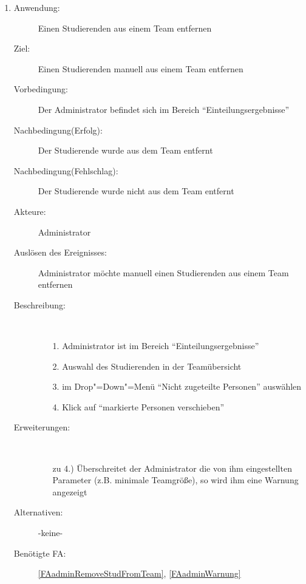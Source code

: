 \documentclass[parskip=full]{scrartcl}
\newcommand{\swtLabel}[1]{\textbf{/#1\arabic*0/}}
\begin{document}
\begin{enumerate} [label=\swtLabel{A}]
  \item \label{UCadminRemoveStudFromTeam}
    \begin{description}
  	\item[Anwendung:] Einen Studierenden aus einem Team entfernen
  	\item[Ziel:] Einen Studierenden manuell aus einem Team entfernen
  	\item[Vorbedingung:] Der Administrator befindet sich im Bereich
  	\enquote{Einteilungsergebnisse}
  	\item[Nachbedingung(Erfolg):] Der Studierende wurde aus dem Team entfernt
  	\item[Nachbedingung(Fehlschlag):] Der Studierende wurde nicht aus dem Team
  	entfernt
  	\item[Akteure:] Administrator
  	\item[Auslösen des Ereignisses:] Administrator möchte manuell einen
  	Studierenden aus einem Team entfernen
  	\item[Beschreibung:]~
  	\begin{enumerate}
  	  \item[1.] Administrator ist im Bereich \enquote{Einteilungsergebnisse}
      \item[2.] Auswahl des Studierenden in der Teamübersicht
      \item[3.] im Drop"=Down"=Menü \enquote{Nicht zugeteilte
      Personen} auswählen
      \item[4.] Klick auf \enquote{markierte Personen verschieben}
  	\end{enumerate}
  	\item[Erweiterungen:]~
  	\begin{enumerate}
  	  \item [zu 4.)] Überschreitet der Administrator die von ihm eingestellten
  	  Parameter (z.B. minimale Teamgröße), so wird ihm eine Warnung angezeigt
  	\end{enumerate}  
  	\item[Alternativen:] -keine-
  	\item[Benötigte FA:] \ref{FAadminRemoveStudFromTeam}, \ref{FAadminWarnung}
  \end{description}
  

\end{enumerate}
\end{document}
